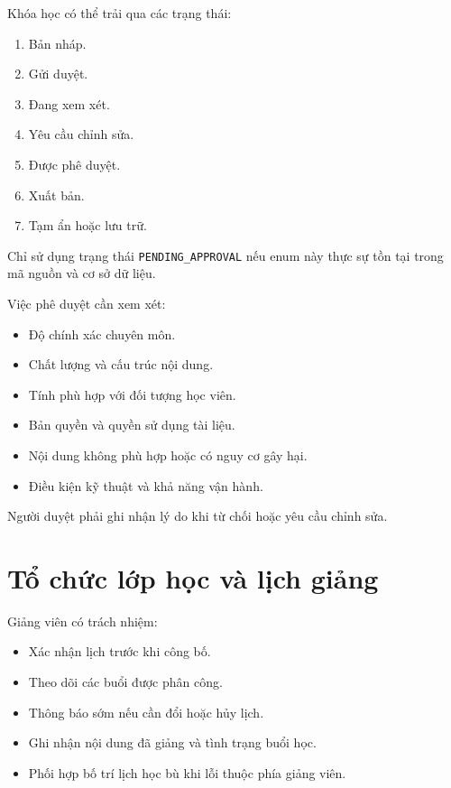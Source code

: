 \documentclass[12pt,a4paper]{article}
\begin{document}
Khóa học có thể trải qua các trạng thái:

\begin{enumerate}
    \item Bản nháp.
    \item Gửi duyệt.
    \item Đang xem xét.
    \item Yêu cầu chỉnh sửa.
    \item Được phê duyệt.
    \item Xuất bản.
    \item Tạm ẩn hoặc lưu trữ.
\end{enumerate}

Chỉ sử dụng trạng thái \texttt{PENDING\_APPROVAL} nếu enum này
thực sự tồn tại trong mã nguồn và cơ sở dữ liệu.

Việc phê duyệt cần xem xét:

\begin{itemize}
    \item Độ chính xác chuyên môn.
    \item Chất lượng và cấu trúc nội dung.
    \item Tính phù hợp với đối tượng học viên.
    \item Bản quyền và quyền sử dụng tài liệu.
    \item Nội dung không phù hợp hoặc có nguy cơ gây hại.
    \item Điều kiện kỹ thuật và khả năng vận hành.
\end{itemize}

Người duyệt phải ghi nhận lý do khi từ chối hoặc yêu cầu chỉnh sửa.

\section{Tổ chức lớp học và lịch giảng}

Giảng viên có trách nhiệm:

\begin{itemize}
    \item Xác nhận lịch trước khi công bố.
    \item Theo dõi các buổi được phân công.
    \item Thông báo sớm nếu cần đổi hoặc hủy lịch.
    \item Ghi nhận nội dung đã giảng và tình trạng buổi học.
    \item Phối hợp bố trí lịch học bù khi lỗi thuộc phía giảng viên.
\end{itemize}
\end{document}
